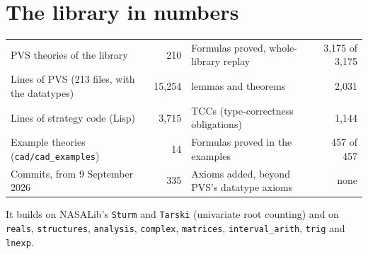 \documentclass[11pt]{article}
\begin{document}
\section{The library in numbers}
\begin{center}\small
\begin{tabular}{@{}l r@{\qquad}l r@{}}
\toprule
PVS theories of the library & 210 & Formulas proved, whole-library replay & 3,175 of 3,175\\
Lines of PVS (213 files, with the datatypes) & 15,254 & \quad lemmas and theorems & 2,031\\
Lines of strategy code (Lisp) & 3,715 & \quad TCCs (type-correctness obligations) & 1,144\\
Example theories (\texttt{cad/cad\_examples}) & 14 & Formulas proved in the examples & 457 of 457\\
Commits, from 9 September 2026 & 335 & Axioms added, beyond PVS's datatype axioms & none\\
\bottomrule
\end{tabular}
\end{center}
It builds on NASALib's \texttt{Sturm} and \texttt{Tarski} (univariate root counting) and on \texttt{reals}, \texttt{structures}, \texttt{analysis}, \texttt{complex}, \texttt{matrices}, \texttt{interval\_arith}, \texttt{trig} and \texttt{lnexp}.
\end{document}
